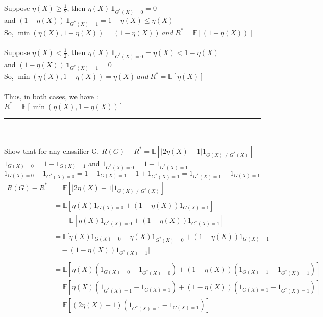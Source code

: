 \documentclass[12pt]{article}
\begin{document}
\begin{enumerate}
Suppose $\eta(X)\ge \tfrac12$, then $\eta(X)\, \mathbf{1}_{G^*(X)=0}=0$\\
and $(1-\eta(X))\, \mathbf{1}_{G^*(X)=1}=1-\eta(X)\le \eta(X)$\\
So, $\min(\eta(X), 1 - \eta(X)) = (1 - \eta(X)) \: and \: R^* = \mathbb{E}[(1 - \eta(X))]$\\\\
Suppose $\eta(X)< \tfrac12$, then $\eta(X)\, \mathbf{1}_{G^*(X)=0}=\eta(X) < 1 - \eta(X)$\\
and $(1-\eta(X))\, \mathbf{1}_{G^*(X)=1}=0$\\
So, $\min(\eta(X), 1 - \eta(X)) = \eta(X) \: and \: R^* = \mathbb{E}[\eta(X)]$\\\\
Thus, in both cases, we have : \\ $R^* = \mathbb{E}[\min(\eta(X), 1 - \eta(X))]$\\
\noindent\rule{8cm}{0.4pt}\\\\
Show that for any classifier G, $R(G) - R^* = \mathbb{E}[|2\eta(X) - 1|1_{G(X) \neq G^*(X)}]$\\

$1_{G(X)= 0} = 1 - 1_{G(X)= 1}$ and $1_{G^*(X)= 0} = 1 - 1_{G^*(X)= 1}$\\
$1_{G(X)=0} - 1_{G^*(X)=0} = 1 - 1_{G(X)=1} - 1 + 1_{G^*(X)=1} = 1_{G^*(X)=1} - 1_{G(X)=1}$
\begin{align*}
R(G) - R^* &= \mathbb{E}[|2\eta(X) - 1|1_{G(X) \neq G^*(X)}]\nonumber\\\\
&= \mathbb{E}[\eta(X)1_{G(X)=0} + (1 - \eta(X))1_{G(X)=1}]\\
&\quad- \mathbb{E}[\eta(X)1_{G^*(X)=0} + (1 - \eta(X))1_{G^*(X)=1}]\\\\
&= \mathbb{E}[\eta(X)1_{G(X)=0} - \eta(X)1_{G^*(X)=0} + (1 - \eta(X))1_{G(X)=1}\\
&\quad- (1 - \eta(X))1_{G^*(X)=1}]\\\\
&= \mathbb{E}[\eta(X)(1_{G(X)=0} - 1_{G^*(X)=0}) + (1 - \eta(X))(1_{G(X)=1} - 1_{G^*(X)=1})]\\
&= \mathbb{E}[\eta(X)(1_{G^*(X)=1} - 1_{G(X)=1}) + (1 - \eta(X))(1_{G(X)=1} - 1_{G^*(X)=1})]\\
&= \mathbb{E}[(2\eta(X) - 1)(1_{G^*(X)=1} - 1_{G(X)=1})]\\
\end{align*}


\end{enumerate}
\end{document}
